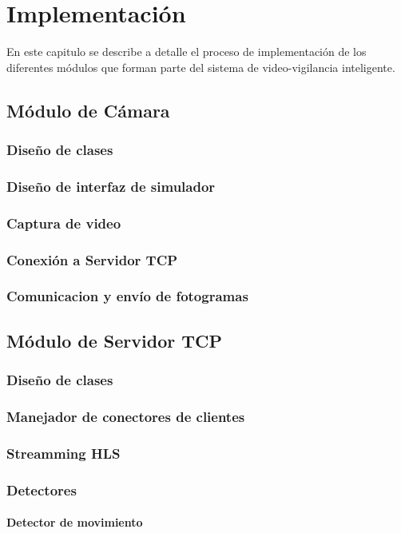 \chapter{Implementación}
En este capitulo se describe a detalle el proceso de implementación de los diferentes módulos que forman parte del sistema  de video-vigilancia inteligente.

\section{Módulo de Cámara}
\subsection{Diseño de clases}
\subsection{Diseño de interfaz de simulador}
\subsection{Captura de video}
\subsection{Conexión a Servidor TCP}
\subsection{Comunicacion y envío de fotogramas}
\section{Módulo de Servidor TCP}
\subsection{Diseño de clases}
\subsection{Manejador de conectores de clientes}
\subsection{Streamming HLS}
\subsection{Detectores}
\subsubsection{Detector de movimiento}
